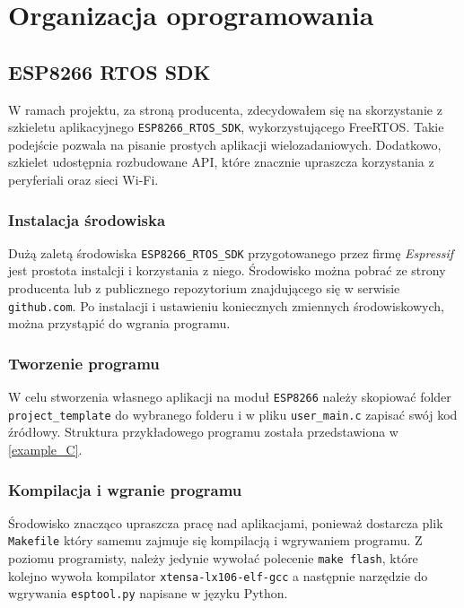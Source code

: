 \chapter{Organizacja oprogramowania}
\label{organizacja_opr} 


\section{ESP8266 RTOS SDK}
\label{sdk}
W ramach projektu, za stroną producenta, zdecydowałem się na skorzystanie z 
szkieletu aplikacyjnego \verb+ESP8266_RTOS_SDK+, wykorzystującego FreeRTOS.
Takie podejście pozwala na pisanie prostych aplikacji wielozadaniowych. Dodatkowo, 
szkielet udostępnia rozbudowane API, które znacznie upraszcza korzystania z peryferiali oraz sieci Wi-Fi. 

\subsection{Instalacja środowiska}
\label{instalacja}
Dużą zaletą środowiska \verb+ESP8266_RTOS_SDK+ przygotowanego przez firmę \textit{Espressif}
jest prostota instalcji i korzystania z niego. Środowisko można pobrać ze strony producenta
lub z publicznego repozytorium znajdującego się w serwisie \verb+github.com+. Po instalacji
i ustawieniu koniecznych zmiennych środowiskowych, można przystąpić do wgrania programu.

\subsection{Tworzenie programu}
\label{tworzenie programu}
W celu stworzenia własnego aplikacji na moduł \verb+ESP8266+ należy skopiować folder 
\verb+project_template+ do wybranego folderu i w pliku \verb+user_main.c+ zapisać swój kod
źródłowy. Struktura przykładowego programu została przedstawiona w \ref{example_C}.

\subsection{Kompilacja i wgranie programu}
\label{kompilacja}
Środowisko znacząco upraszcza pracę nad aplikacjami, ponieważ dostarcza plik \verb+Makefile+
który samemu zajmuje się kompilacją i wgrywaniem programu. Z poziomu programisty, należy jedynie
wywołać polecenie \texttt{make flash}, które kolejno wywoła kompilator \verb+xtensa-lx106-elf-gcc+
a następnie narzędzie do wgrywania \verb+esptool.py+ napisane w języku Python.

